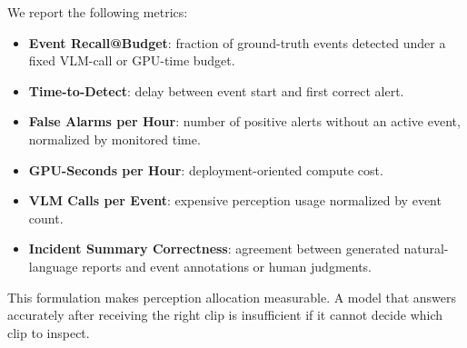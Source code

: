 We report the following metrics:

\begin{itemize}
    \item \textbf{Event Recall@Budget}: fraction of ground-truth events detected under a fixed VLM-call or GPU-time budget.
    \item \textbf{Time-to-Detect}: delay between event start and first correct alert.
    \item \textbf{False Alarms per Hour}: number of positive alerts without an active event, normalized by monitored time.
    \item \textbf{GPU-Seconds per Hour}: deployment-oriented compute cost.
    \item \textbf{VLM Calls per Event}: expensive perception usage normalized by event count.
    \item \textbf{Incident Summary Correctness}: agreement between generated natural-language reports and event annotations or human judgments.
\end{itemize}

This formulation makes perception allocation measurable. A model that answers accurately after receiving the right clip is insufficient if it cannot decide which clip to inspect.
